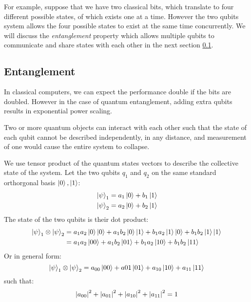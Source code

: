 For example, suppose that we have two classical bits, which translate to four different possible states, of which exists one at a time.
However the two qubits system allows the four possible states to exist at the same time concurrently.
We will discuss the \emph{entanglement} property which allows multiple qubits to communicate and share states with each other in the next section \ref{Sec: Entanglement}.

\subsection{Entanglement} \label{Sec: Entanglement}

In classical computers, we can expect the performance double if the bits are doubled.
However in the case of quantum entanglement, adding extra qubits results in exponential power scaling.

Two or more quantum objects can interact with each other such that the state of each qubit cannot be described independently, in any distance, and measurement of one would cause the entire system to collapse.

We use tensor product of the quantum states vectors to describe the collective state of the system.
Let the two qubits $q_1$ and $q_2$ on the same standard orthorgonal basis ${\left\vert{0}\right\rangle, \left\vert{1}\right\rangle}$:
\begin{equation}
    \begin{split}
        & \left\vert{\psi}\right\rangle_1 = a_1\left\vert{0}\right\rangle + b_1\left\vert{1}\right\rangle \\
        & \left\vert{\psi}\right\rangle_2 = a_2\left\vert{0}\right\rangle + b_2\left\vert{1}\right\rangle
    \end{split}
\end{equation}
The state of the two qubits is their dot product:
\begin{equation}
    \begin{split}
        \left\vert{\psi}\right\rangle_1\otimes\left\vert{\psi}\right\rangle_2
        & = a_1 a_2 \left\vert{0}\right\rangle\left\vert{0}\right\rangle + a_1 b_2 \left\vert{0}\right\rangle\left\vert{1}\right\rangle + b_1 a_2 \left\vert{1}\right\rangle \left\vert{0}\right\rangle + b_1 b_2 \left\vert{1}\right\rangle \left\vert{1}\right\rangle \\
        & = a_1 a_2 \left\vert{00}\right\rangle + a_1 b_2 \left\vert{01}\right\rangle + b_1 a_2 \left\vert{10}\right\rangle + b_1 b_2 \left\vert{11}\right\rangle
    \end{split}
\end{equation}
Or in general form:
\begin{equation}
        \left\vert{\psi}\right\rangle_1\otimes\left\vert{\psi}\right\rangle_2
        = a_{00} \left\vert{00}\right\rangle + a{01} \left\vert{01}\right\rangle + a_{10} \left\vert{10}\right\rangle + a_{11} \left\vert{11}\right\rangle
\end{equation}
such that:
\begin{equation}
    \abs{a_{00}}^2 + \abs{a_{01}}^2 + \abs{a_{10}}^2 + \abs{a_{11}}^2 = 1
\end{equation}

